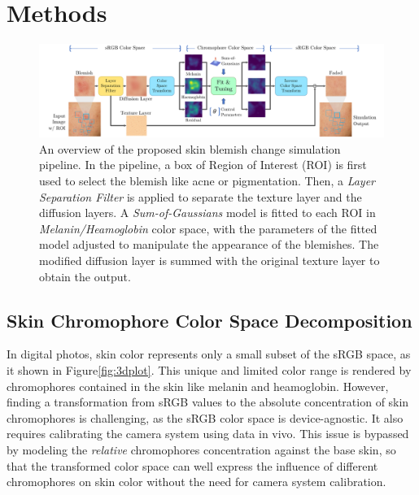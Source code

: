 
\chapter{Methods}
\begin{spacing}{1.5}
\setlength{\parskip}{0.3in}
\begin{figure}[t]
    \centering
    \includegraphics[width=0.94\columnwidth]{Chapter3/system.pdf}
    \caption{An overview of the proposed skin blemish change simulation pipeline. In the pipeline, a box of Region of Interest (ROI) is first used to select the blemish like acne or pigmentation. Then, a \textit{Layer Separation Filter} is applied to separate the texture layer and the diffusion layers. A \textit{Sum-of-Gaussians} model is fitted to each ROI in \textit{Melanin/Heamoglobin} color space, with the parameters of the fitted model adjusted to manipulate the appearance of the blemishes. The modified diffusion layer is summed with the original texture layer to obtain the output.}
    \label{fig:system}
\end{figure}

\section{Skin Chromophore Color Space Decomposition}
In digital photos, skin color represents only a small subset of the sRGB space, as it shown in Figure\ref{fig:3dplot}. This unique and limited color range is rendered by chromophores contained in the skin like melanin and heamoglobin. However, finding a transformation from sRGB values to the absolute concentration of skin chromophores is challenging, as the sRGB color space is device-agnostic. It also requires calibrating the camera system using data in vivo. This issue is bypassed by modeling the \textit{relative} chromophores concentration against the base skin, so that the transformed color space can well express the influence of different chromophores on skin color without the need for camera system calibration.


\end{spacing}
